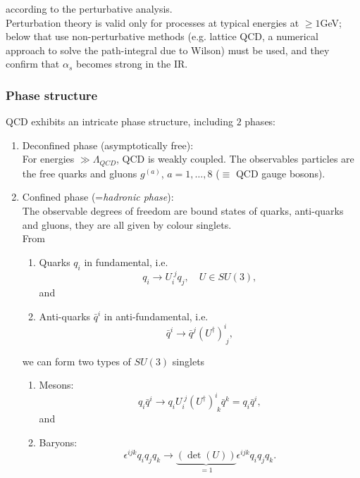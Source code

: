 according to the perturbative analysis.
\\
Perturbation theory is valid only for processes at typical energies at $\geq 1$GeV; below that use non-perturbative methods (e.g. lattice QCD, a numerical approach to solve the path-integral due to Wilson) must be used, and they confirm that $\alpha_s$ becomes strong in the IR.
\subsubsection{Phase structure}
QCD exhibits an intricate phase structure, including $2$ phases:
\begin{enumerate}
\item Deconfined phase (asymptotically free):\\
For energies $\gg \Lambda_{QCD}$, QCD is weakly coupled. The observables particles are the free quarks and gluons $g^{(a)}$, $a=1,\dots,8$ ($\equiv$ QCD gauge bosons).
\item Confined phase (=\emph{hadronic phase}):\\
The observable degrees of freedom are bound states of quarks, anti-quarks and gluons, they are all given by colour singlets.\\
From
\begin{enumerate}
	\item Quarks $q_i$ in fundamental, i.e.
	\begin{equation}
		q_i \rightarrow U^{\;j}_i q_j,\quad U\in SU(3),
	\end{equation}
	and
	\item Anti-quarks $\bar{q}^i$ in anti-fundamental, i.e.
	\begin{equation}
		\bar{q}^i \rightarrow \bar{q}^j (U^\dagger)^i_{\;j},
	\end{equation}
\end{enumerate}
we can form two types of $SU(3)$ singlets
\begin{enumerate}
	\item Mesons:
	\begin{equation}
		q_i \bar{ q}^i \rightarrow q_i U^{\;j}_i (U^\dagger)^i_{\;k} \bar{q}^k = q_i \bar{q}^i,
	\end{equation}
	and
	\item Baryons:
	\begin{equation}
		\epsilon^{ijk} q_i q_j q_k \rightarrow \underbrace{(\det(U))}_{=1} \epsilon^{ijk} q_i q_j q_k.
	\end{equation}
\end{enumerate}
\end{enumerate}
